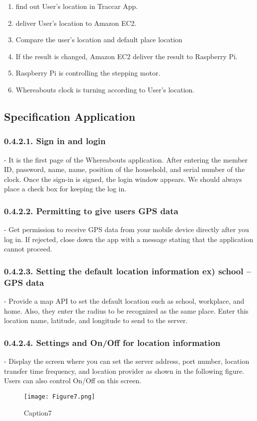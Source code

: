 \documentclass[10pt,a4paper,twocolumn]{report}
\begin{document}
		 \begin{enumerate}
		 
		 \item find out User’s location in Traccar App.
		 \item deliver User’s location to Amazon EC2. 
		 \item Compare the user’s location and default place location 
		 \item If the result is changed, Amazon EC2 deliver the result to Raspberry Pi. 
		 \item Raspberry Pi is controlling the stepping motor. 
		 \item Whereabouts clock is turning according to User’s location. 
 		\end{enumerate}
 	\subsection{Specification Application}
 		\subsubsection{0.4.2.1. Sign in and login}
 		- It is the first page of the Whereabouts application. After entering the member ID, password, name, name, position of the household, and serial number of the clock. Once the sign-in is signed, the login window appears. We should always place a check box for keeping the log in.\\
 		\subsubsection{0.4.2.2. Permitting to give users GPS data}
 		- Get permission to receive GPS data from your mobile device directly after you log in. If rejected, close down the app with a message stating that the application cannot proceed.\\
 		\subsubsection{0.4.2.3. Setting the default location information ex) school – GPS data }
 		- Provide a map API to set the default location such as school, workplace, and home. Also, they enter the radius to be recognized as the same place. Enter this location name, latitude, and longitude to send to the server.\\
 		\subsubsection{0.4.2.4. Settings and On/Off for location information}
 		- Display the screen where you can set the server address, port number, location transfer time frequency, and location provider as shown in the following figure. Users can also control On/Off on this screen. \\
 		\begin{figure}[h]
				\texttt{[image: Figure7.png]}
				\caption{Caption7}
				\label{fig7}
		\end{figure}
\end{document}
